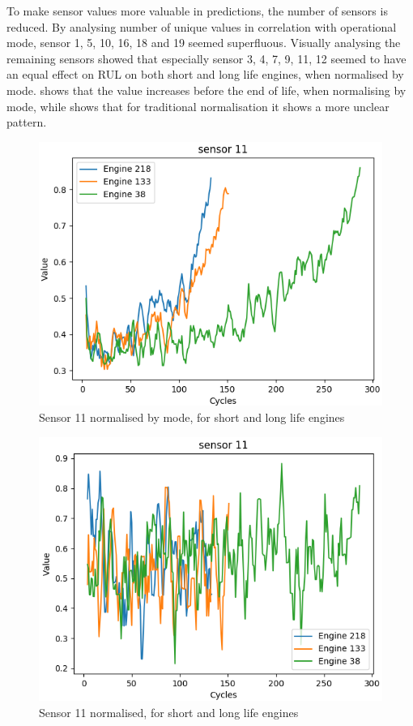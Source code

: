 \documentclass[english, a4paper]{report}
\begin{document}
{{{{                To make sensor values more valuable in predictions, the number of sensors is reduced. By analysing number of unique values in correlation with operational mode, sensor 1, 5, 10, 16, 18 and 19 seemed superfluous. Visually analysing the remaining sensors showed that especially sensor 3, 4, 7, 9, 11, 12 seemed to have an equal effect on RUL on both short and long life engines, when normalised by mode.  shows that the value increases before the end of life, when normalising by mode, while  shows that for traditional normalisation it shows a more unclear pattern. 
                
                \begin{figure}[H]
                    \centering \includegraphics[width=0.6\linewidth]{FiltSens11}
                    \caption{Sensor 11 normalised by mode, for short and long life engines}
                    \label{fig:FiltSens11}
                \end{figure}
                
                \begin{figure}[H]
                    \centering \includegraphics[width=0.6\linewidth]{NormNormSens11}
                    \caption{Sensor 11 normalised, for short and long life engines}
                    \label{fig:NormNormSens11}
                \end{figure}
                
}}}}
\end{document}
